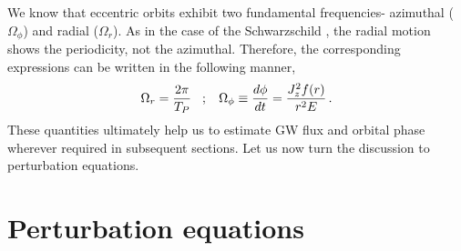 \documentclass[11pt]{article}
\begin{document}
%
We know that eccentric orbits exhibit two fundamental frequencies- azimuthal ($\Omega_{\phi}$) and radial ($\Omega_{r}$). As in the case of the Schwarzschild \cite{PhysRevD.50.3816}, the radial motion shows the periodicity, not the azimuthal. Therefore, the corresponding expressions can be written in the following manner, %
\begin{align}
  \Omega_{r} = \frac{2\pi}{T_{P}} \hspace{3mm} ; \hspace{3mm}  \Omega_{\phi} \equiv \frac{d\phi}{dt} = \frac{J_{z}^{2}f(r)}{r^{2}E} \,. %
\end{align}
These quantities ultimately help us to estimate GW flux and orbital phase wherever required in subsequent sections. Let us now turn the discussion to perturbation equations.

\section{Perturbation equations}\label{pert1}
\end{document}
